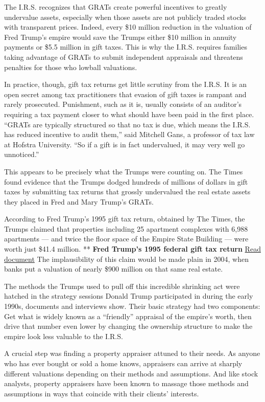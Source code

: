 The I.R.S. recognizes that GRATs create powerful incentives to greatly
undervalue assets, especially when those assets are not publicly traded
stocks with transparent prices. Indeed, every \$10 million reduction in
the valuation of Fred Trump's empire would save the Trumps either \$10
million in annuity payments or \$5.5 million in gift taxes. This is why
the I.R.S. requires families taking advantage of GRATs to submit
independent appraisals and threatens penalties for those who lowball
valuations.

In practice, though, gift tax returns get little scrutiny from the
I.R.S. It is an open secret among tax practitioners that evasion of gift
taxes is rampant and rarely prosecuted. Punishment, such as it is,
usually consists of an auditor's requiring a tax payment closer to what
should have been paid in the first place. ``GRATs are typically
structured so that no tax is due, which means the I.R.S. has reduced
incentive to audit them,'' said Mitchell Gans, a professor of tax law at
Hofstra University. ``So if a gift is in fact undervalued, it may very
well go unnoticed.''

This appears to be precisely what the Trumps were counting on. The Times
found evidence that the Trumps dodged hundreds of millions of dollars in
gift taxes by submitting tax returns that grossly undervalued the real
estate assets they placed in Fred and Mary Trump's GRATs.

According to Fred Trump's 1995 gift tax return, obtained by The Times,
the Trumps claimed that properties including 25 apartment complexes with
6,988 apartments --- and twice the floor space of the Empire State
Building --- were worth just \$41.4 million. ** \textbf{Fred Trump's
1995 federal gift tax return}
\href{https://int.nyt.com/data/documenthelper/141-fct-federal-gift-return/9c5e1010469adaac01a2/optimized/full.pdf\#page=1}{Read
document} The implausibility of this claim would be made plain in 2004,
when banks put a valuation of nearly \$900 million on that same real
estate.

The methods the Trumps used to pull off this incredible shrinking act
were hatched in the strategy sessions Donald Trump participated in
during the early 1990s, documents and interviews show. Their basic
strategy had two components: Get what is widely known as a ``friendly''
appraisal of the empire's worth, then drive that number even lower by
changing the ownership structure to make the empire look less valuable
to the I.R.S.

A crucial step was finding a property appraiser attuned to their needs.
As anyone who has ever bought or sold a home knows, appraisers can
arrive at sharply different valuations depending on their methods and
assumptions. And like stock analysts, property appraisers have been
known to massage those methods and assumptions in ways that coincide
with their clients' interests.

